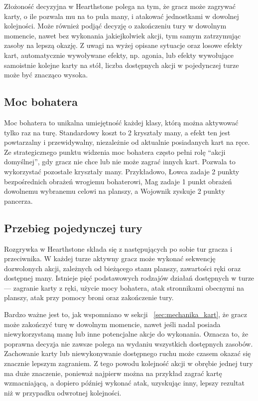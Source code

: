 Złożoność decyzyjna w Hearthstone polega na tym, że gracz może zagrywać karty, o ile pozwala mu na to pula many, i atakować jednostkami w dowolnej kolejności. Może również podjąć decyzję o zakończeniu tury w dowolnym momencie, nawet bez wykonania jakiejkolwiek akcji, tym samym zatrzymując zasoby na lepszą okazję. Z uwagi na wyżej opisane sytuacje oraz losowe efekty kart, automatycznie wywoływane efekty, np. agonia, lub efekty wywołujące samoistnie kolejne karty na stół, liczba dostępnych akcji w pojedynczej turze może być znacząco wysoka.

\subsection{Moc bohatera}
Moc bohatera to unikalna umiejętność każdej klasy, którą można aktywować tylko raz na turę. Standardowy koszt to 2 kryształy many, a efekt ten jest powtarzalny i przewidywalny, niezależnie od aktualnie posiadanych kart na ręce. Ze strategicznego punktu widzenia moc bohatera często pełni rolę \enquote{akcji domyślnej}, gdy gracz nie chce lub nie może zagrać innych kart. Pozwala to wykorzystać pozostałe kryształy many. Przykładowo, Łowca zadaje 2 punkty bezpośrednich obrażeń wrogiemu bohaterowi, Mag zadaje 1 punkt obrażeń dowolnemu wybranemu celowi na planszy, a Wojownik zyskuje 2 punkty pancerza.

\subsection{Przebieg pojedynczej tury}
Rozgrywka w Hearthstone składa się z następujących po sobie tur gracza i przeciwnika. W każdej turze aktywny gracz może wykonać sekwencję dozwolonych akcji, zależnych od bieżącego stanu planszy, zawartości ręki oraz dostępnej many. Istnieje pięć podstawowych rodzajów działań dostępnych w turze --- zagranie karty z ręki, użycie mocy bohatera, atak stronnikami obecnymi na planszy, atak przy pomocy broni oraz zakończenie tury.

Bardzo ważne jest to, jak wspomniano w sekcji ~\ref{sec:mechanika_kart}, że gracz może zakończyć turę w dowolnym momencie, nawet jeśli nadal posiada niewykorzystaną manę lub inne potencjalne akcje do wykonania. Oznacza to, że poprawna decyzja nie zawsze polega na wydaniu wszystkich dostępnych zasobów. Zachowanie karty lub niewykonywanie dostępnego ruchu może czasem okazać się znacznie lepszym zagraniem. Z tego powodu kolejność akcji w obrębie jednej tury ma duże znaczenie, ponieważ najpierw można na przykład zagrać kartę wzmacniającą, a dopiero później wykonać atak, uzyskując inny, lepszy rezultat niż w przypadku odwrotnej kolejności.

